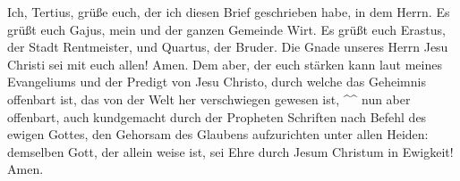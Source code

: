  Ich, Tertius, grüße euch, der ich diesen Brief
geschrieben habe, in dem Herrn.  Es grüßt euch Gajus,
mein und der ganzen Gemeinde Wirt. Es grüßt euch Erastus, der Stadt
Rentmeister, und Quartus, der Bruder.  Die Gnade unseres
Herrn Jesu Christi sei mit euch allen! Amen.  Dem aber,
der euch stärken kann laut meines Evangeliums und der Predigt von Jesu
Christo, durch welche das Geheimnis offenbart ist, das von der Welt her
verschwiegen gewesen ist, \^{}\^{}  nun aber offenbart,
auch kundgemacht durch der Propheten Schriften nach Befehl des ewigen
Gottes, den Gehorsam des Glaubens aufzurichten unter allen Heiden:
 demselben Gott, der allein weise ist, sei Ehre durch
Jesum Christum in Ewigkeit! Amen.
